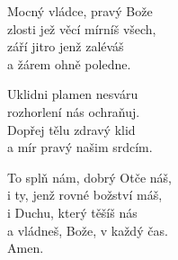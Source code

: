 \begin{translatioMulticol}{3}
Mocný vládce, pravý Bože\\
zlosti jež věcí mírníš všech,\\
září jitro jenž zaléváš\\
a žárem ohně poledne.\columnbreak

Uklidni plamen nesváru\\
rozhorlení nás ochraňuj.\\
Dopřej tělu zdravý klid\\
a mír pravý našim srdcím.\columnbreak

To splň nám, dobrý Otče náš,\\
i ty, jenž rovné božství máš,\\
i Duchu, který těšíš nás\\
a vládneš, Bože, v každý čas.\\
Amen.
\end{translatioMulticol}
